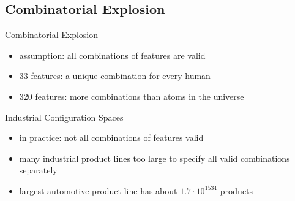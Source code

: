 \subsection{Combinatorial Explosion}
\begin{frame}{\myframetitle}
	\begin{mycolumns}[widths={49}]
		\begin{exampletight}{Combinatorial Explosion}
			\small%
			\begin{itemize}
				\item assumption: all combinations of features are valid
				\item 33 features: a unique combination for every human
				\item 320 features: more combinations than atoms in the universe
			\end{itemize}
		\end{exampletight}
	\mynextcolumn
		\begin{exampletight}{Industrial Configuration Spaces \mysource{\evaluatingsharpsatsolvers}}
			\small%
			\begin{itemize}
				\item in practice: not all combinations of features valid
				\item many industrial product lines too large to specify all valid combinations separately
				\item largest automotive product line has about $1.7 \cdot 10^{1534}$ products
			\end{itemize}
		\end{exampletight}
	\end{mycolumns}
\end{frame}
\begin{frame}{\myframetitle}
	\centering\href{https://github.com/SoftVarE-Group/Slides/blob/main/2021/2021-02-10-VaMoS-SharpSATApplications.pdf}{}
\end{frame}

